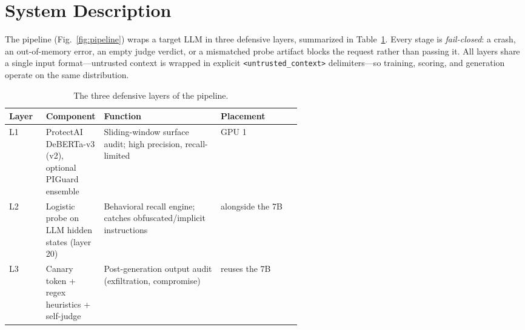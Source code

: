 \documentclass[conference]{IEEEtran}
\begin{document}
\section{System Description}
\label{sec:system}

The pipeline (Fig.~\ref{fig:pipeline}) wraps a target LLM in three defensive
layers, summarized in Table~\ref{tab:layers}. Every stage is
\emph{fail-closed}: a crash, an out-of-memory error, an empty judge verdict, or
a mismatched probe artifact blocks the request rather than passing it. All
layers share a single input format---untrusted context is wrapped in explicit
\texttt{<untrusted\_context>} delimiters---so training, scoring, and generation
operate on the same distribution.

\begin{table}[!t]
\caption{The three defensive layers of the pipeline.}
\label{tab:layers}
\centering
\begin{tabular}{@{}l p{0.16\linewidth} p{0.40\linewidth} l@{}}
\toprule
\textbf{Layer} & \textbf{Component} & \textbf{Function} & \textbf{Placement}\\
\midrule
L1 & ProtectAI DeBERTa-v3 (v2), optional PIGuard ensemble & Sliding-window surface audit; high precision, recall-limited & GPU 1 \\
L2 & Logistic probe on LLM hidden states (layer 20) & Behavioral recall engine; catches obfuscated/implicit instructions & alongside the 7B \\
L3 & Canary token + regex heuristics + self-judge & Post-generation output audit (exfiltration, compromise) & reuses the 7B \\
\bottomrule
\end{tabular}
\end{table}
\end{document}
